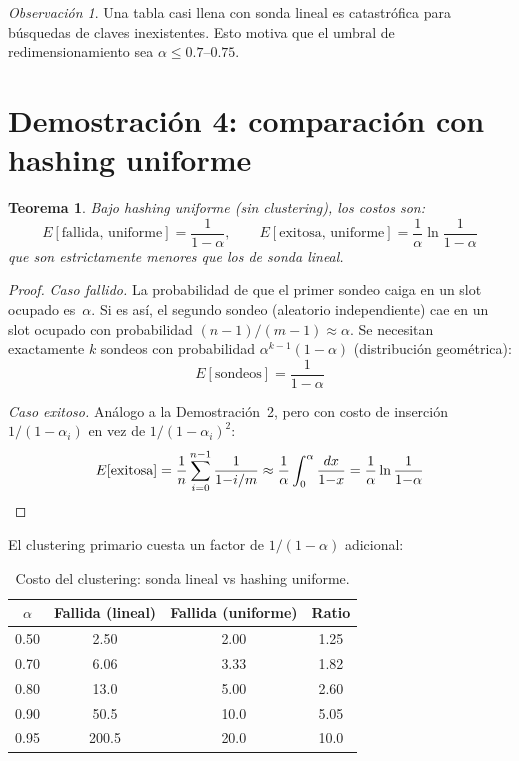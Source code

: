 \documentclass[11pt, letterpaper]{article}
\theoremstyle{definition}
\theoremstyle{plain}
\newtheorem{theorem}{Teorema}[section]
\theoremstyle{remark}
\newtheorem{remark}{Observación}[section]
\begin{document}
\begin{remark}
Una tabla casi llena con sonda lineal es catastrófica para búsquedas
de claves inexistentes. Esto motiva que el umbral de
redimensionamiento sea $\alpha \leq 0.7$--$0.75$.
\end{remark}

\section{Demostración 4: comparación con hashing uniforme}

\begin{theorem}\label{thm:uniform}
Bajo hashing uniforme (sin clustering), los costos son:
\[
  E[\text{fallida, uniforme}] = \frac{1}{1-\alpha}, \qquad
  E[\text{exitosa, uniforme}] = \frac{1}{\alpha}
    \ln\frac{1}{1-\alpha}
\]
que son estrictamente menores que los de sonda lineal.
\end{theorem}

\begin{proof}
\emph{Caso fallido.} La probabilidad de que el primer sondeo caiga en
un slot ocupado es~$\alpha$. Si es así, el segundo sondeo (aleatorio
independiente) cae en un slot ocupado con probabilidad
$(n{-}1)/(m{-}1) \approx \alpha$. Se necesitan exactamente $k$
sondeos con probabilidad $\alpha^{k-1}(1{-}\alpha)$ (distribución
geométrica):
\[
  E[\text{sondeos}] = \frac{1}{1-\alpha}
\]

\emph{Caso exitoso.} Análogo a la Demostración~2, pero con costo de
inserción $1/(1{-}\alpha_i)$ en vez de $1/(1{-}\alpha_i)^2$:
\[
  E[\text{exitosa}]
  = \frac{1}{n}\sum_{i=0}^{n-1}\frac{1}{1{-}i/m}
  \approx \frac{1}{\alpha}\int_0^{\alpha}\frac{dx}{1{-}x}
  = \frac{1}{\alpha}\ln\frac{1}{1{-}\alpha} \qedhere
\]
\end{proof}

El clustering primario cuesta un factor de $1/(1{-}\alpha)$ adicional:

\begin{table}[h]
\centering
\caption{Costo del clustering: sonda lineal vs hashing uniforme.}
\begin{tabular}{cccc}
\toprule
$\alpha$ & Fallida (lineal) & Fallida (uniforme)
  & Ratio \\
\midrule
0.50 & 2.50  & 2.00 & 1.25 \\
0.70 & 6.06  & 3.33 & 1.82 \\
0.80 & 13.0  & 5.00 & 2.60 \\
0.90 & 50.5  & 10.0 & 5.05 \\
0.95 & 200.5 & 20.0 & 10.0 \\
\bottomrule
\end{tabular}
\end{table}
\end{document}
